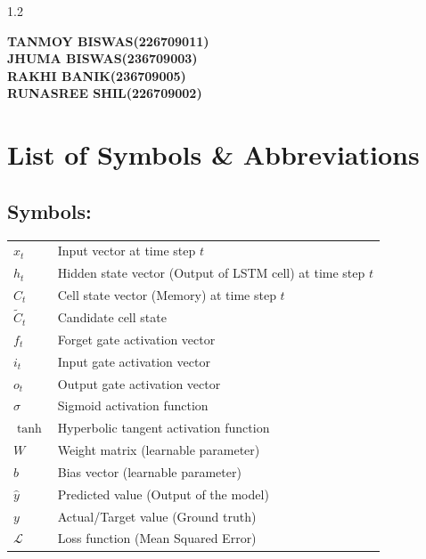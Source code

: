 \documentclass[12pt, a4paper]{report}
\begin{document}
\begin{spacing}{1.2}
\vspace{2cm}

\begin{flushright}
    {\bf TANMOY BISWAS\quad(226709011)}\\\vspace{0.7cm}
    {\bf JHUMA BISWAS\quad(236709003)}\\\vspace{0.7cm}
    {\bf RAKHI BANIK\quad(236709005)}\\\vspace{0.7cm}
    {\bf RUNASREE SHIL\quad(226709002)}\\
\end{flushright}
\newpage
\tableofcontents
\newpage
\listoffigures
\newpage
\listoftables

\newpage
\chapter*{List of Symbols \& Abbreviations}
\vspace{-0.5cm}
\section*{Symbols:}
\begin{longtable}{lp{9.3cm}}
    $x_t$ & Input vector at time step $t$\\
    $h_t$ & Hidden state vector (Output of LSTM cell) at time step $t$\\
    $C_t$ & Cell state vector (Memory) at time step $t$\\
    $\tilde{C}_t$ & Candidate cell state\\
    $f_t$ & Forget gate activation vector\\
    $i_t$ & Input gate activation vector\\
    $o_t$ & Output gate activation vector\\
    $\sigma$ & Sigmoid activation function\\
    $\tanh$ & Hyperbolic tangent activation function\\
    $W$ & Weight matrix (learnable parameter)\\
    $b$ & Bias vector (learnable parameter)\\
    $\hat{y}$ & Predicted value (Output of the model)\\
    $y$ & Actual/Target value (Ground truth)\\
    $\mathcal{L}$ & Loss function (Mean Squared Error)\\
\end{longtable}

\end{spacing}
\end{document}

